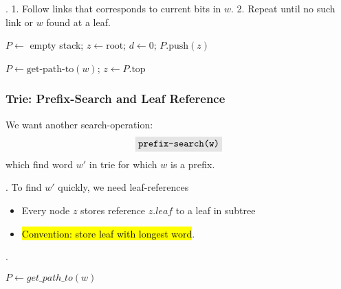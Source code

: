 \documentclass{article}
\begin{document}
\begin{algo}[].
    1. Follow links that corresponds to current bits in $w$. 2. Repeat until no such link or $w$ found at a leaf. \\ 
    \begin{algorithm}[H]
        \DontPrintSemicolon 
        \BlankLine
        
        $P \leftarrow$ empty stack; $z \leftarrow \text{root}$; $d \leftarrow 0$; $P.\text{push}(z)$\;
        \;
        \caption{}
    \end{algorithm}
    \begin{algorithm}[H]
        \DontPrintSemicolon 
        \BlankLine
        
        $P \leftarrow \text{get-path-to}(w)$; \quad $z \leftarrow P.\text{top}$\;
        \;
        \caption{}
    \end{algorithm}
\end{algo}

\subsubsection{Trie: Prefix-Search and Leaf Reference} 

We want another search-operation: 
\[ \code{prefix-search(w)} \] 
which find word $w'$ in trie for which $w$ is a prefix. 

\begin{algo}[].
    To find $w'$ quickly, we need leaf-references \begin{itemize}
        \item Every node $z$ stores reference $z.leaf$ to a leaf in subtree 
        \item \hl{Convention: store leaf with longest word}. 
    \end{itemize}
\end{algo}

\begin{codes}[].
    \begin{algorithm}[H]
        \DontPrintSemicolon 
        \BlankLine
        
        $P \leftarrow get\_path\_to(w)$ \;
        \caption{}
    \end{algorithm}
\end{codes}
\end{document}
